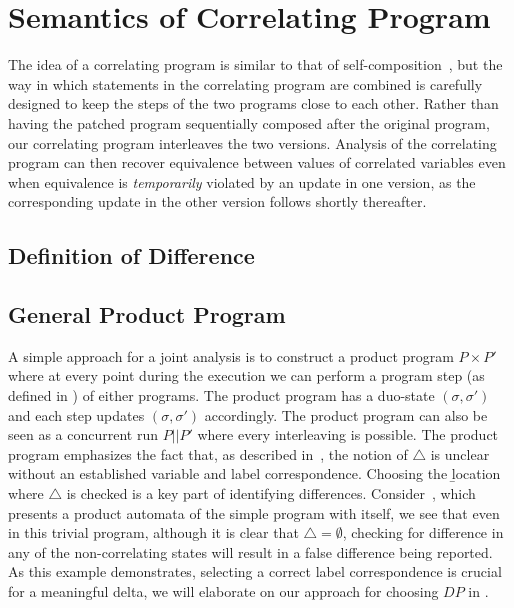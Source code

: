 \section{Semantics of Correlating Program} 

The idea of a correlating program is similar to that of
self-composition~\cite{BartheDArgenioRezk04,AikenTerauchi05}, but the way in
which statements in the correlating program are combined is carefully designed to
keep the steps of the two programs close to each other. Rather than having
the patched program sequentially composed after the original program, our
correlating program interleaves the two versions. Analysis of the correlating program can then recover equivalence between values of correlated variables even when
equivalence is \emph{temporarily} violated by an update in one version, as
the corresponding update in the other version follows shortly thereafter.

\subsection{Definition of Difference} 

\subsection{General Product Program} 
A simple approach for a joint analysis is to construct a product program $P \times P'$ where at every point during the execution we can perform a program step (as defined in ) of either programs. The product program has a duo-state $(\sigma,\sigma')$ and each step updates $(\sigma,\sigma')$ accordingly. The product program can also be seen as a concurrent run $P||P'$ where every interleaving is possible. The product program emphasizes the fact that, as described in~, the notion of $\triangle$ is unclear without an established variable and label correspondence. Choosing the \b{location} where $\triangle$ is checked is a key part of identifying differences. Consider~, which presents a product automata of the simple program with itself, we see that even in this trivial program, although it is clear that $\triangle = \emptyset$, checking for difference in any of the non-correlating states will result in a false difference being reported. As this example demonstrates, selecting a correct label correspondence is crucial for a meaningful delta, we will elaborate on our approach for choosing $DP$ in .

